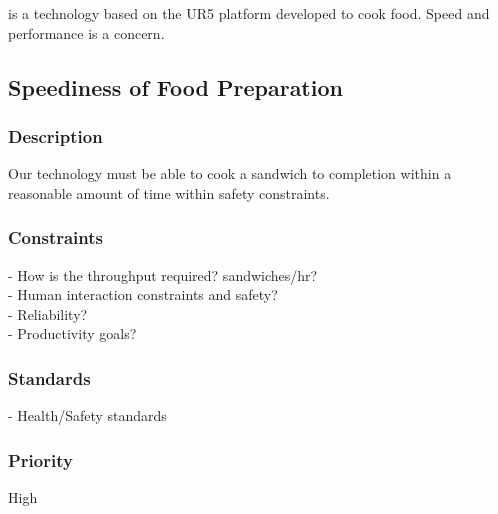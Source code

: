 \productname{} is a technology based on the UR5 platform developed to cook food. Speed and performance is a concern. 

\subsection{Speediness of Food Preparation}
\subsubsection{Description}
Our technology must be able to cook a sandwich to completion within a reasonable amount of time within safety constraints.
\subsubsection{Constraints}
- How is the throughput required? sandwiches/hr?\\
- Human interaction constraints and safety?\\
- Reliability? \\
- Productivity goals?
\subsubsection{Standards}
- Health/Safety standards\\
\subsubsection{Priority}
High


